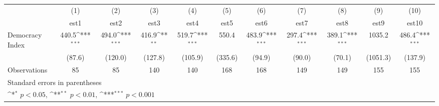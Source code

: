 {
\def\sym#1{\ifmmode^{#1}\else\(^{#1}\)\fi}
\begin{tabular}{l*{10}{c}}
\hline\hline
                    &\multicolumn{1}{c}{(1)}         &\multicolumn{1}{c}{(2)}         &\multicolumn{1}{c}{(3)}         &\multicolumn{1}{c}{(4)}         &\multicolumn{1}{c}{(5)}         &\multicolumn{1}{c}{(6)}         &\multicolumn{1}{c}{(7)}         &\multicolumn{1}{c}{(8)}         &\multicolumn{1}{c}{(9)}         &\multicolumn{1}{c}{(10)}         \\
                    &        est1         &        est2         &        est3         &        est4         &        est5         &        est6         &        est7         &        est8         &        est9         &       est10         \\
\hline
Democracy Index     &       440.5\sym{***}&       494.0\sym{***}&       416.9\sym{**} &       519.7\sym{***}&       550.4         &       483.9\sym{***}&       297.4\sym{***}&       389.1\sym{***}&      1035.2         &       486.4\sym{***}\\
                    &      (87.6)         &     (120.0)         &     (127.8)         &     (105.9)         &     (335.6)         &      (94.9)         &      (90.0)         &      (70.1)         &    (1051.3)         &     (137.9)         \\
\hline
Observations        &          85         &          85         &         140         &         140         &         168         &         168         &         149         &         149         &         155         &         155         \\
\hline\hline
\multicolumn{11}{l}{\footnotesize Standard errors in parentheses}\\
\multicolumn{11}{l}{\footnotesize \sym{*} \(p<0.05\), \sym{**} \(p<0.01\), \sym{***} \(p<0.001\)}\\
\end{tabular}
}
